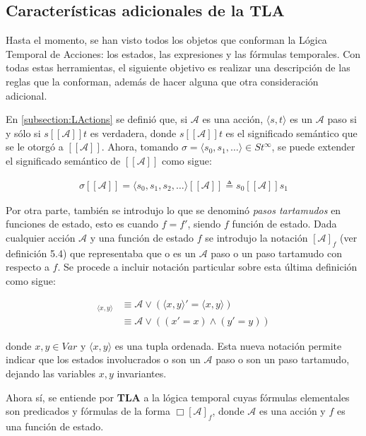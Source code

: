 \subsection{Características adicionales de la TLA}
Hasta el momento, se han visto todos los objetos que conforman la Lógica Temporal de Acciones: los estados, las expresiones y las fórmulas temporales. Con todas estas herramientas, el siguiente objetivo es realizar una descripción de las reglas que la conforman, además de hacer alguna que otra consideración adicional.

En \ref{subsection:LActions} se definió que, si $\mathcal{A}$ es una acción, $\langle s,t \rangle$ es un $\mathcal{A}$ paso si y sólo si $s[[\mathcal{A}]]t$ es verdadera, donde $s[[\mathcal{A}]]t$ es el significado semántico que se le otorgó a $[[\mathcal{A}]]$. Ahora, tomando $\sigma = \langle s_0, s_1, \ldots \rangle \in St^\infty$, se puede extender el significado semántico de $[[\mathcal{A}]]$ como sigue: 

\begin{align}
\sigma[[\mathcal{A}]] = \langle s_0, s_1, s_2, \ldots \rangle[[\mathcal{A}]] \triangleq s_0[[\mathcal{A}]]s_1
\end{align}

Por otra parte, también se introdujo lo que se denominó \textit{pasos tartamudos} en funciones de estado, esto es cuando $f = f'$, siendo $f$ función de estado. Dada cualquier acción $\mathcal{A}$ y una función de estado $f$ se introdujo la notación $[\mathcal{A}]_f$ (ver definición 5.4) que representaba que o es un $\mathcal{A}$ paso o un paso tartamudo con respecto a $f$. Se procede a incluir notación particular sobre esta última definición como sigue:

\begin{align}
[\mathcal{A}]_{\langle x,y \rangle} &\equiv \mathcal{A} \lor (\langle x,y \rangle ' = \langle x,y \rangle) \\ \nonumber
&\equiv \mathcal{A} \lor ((x' = x) \land (y' = y))
\end{align}

donde $x,y \in Var$ y $\langle x,y \rangle$ es una tupla ordenada. Esta nueva notación permite indicar que los estados involucrados o son un $\mathcal{A}$ paso o son un paso tartamudo, dejando las variables $x,y$ invariantes.

Ahora sí, se entiende por \textbf{TLA} a la lógica temporal cuyas fórmulas elementales son predicados y fórmulas de la forma $\Box[\mathcal{A}]_f$, donde $\mathcal{A}$ es una acción y $f$ es una función de estado.

